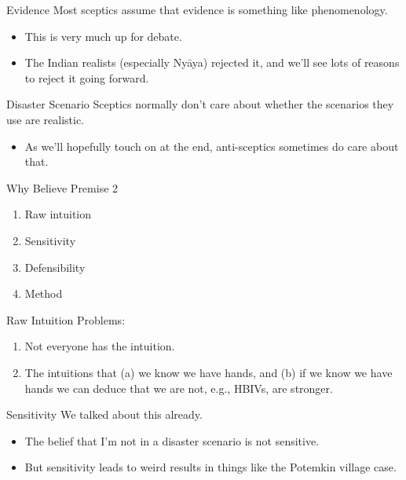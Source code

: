 \documentclass[
  17pt,
  letterpaper,
  ignorenonframetext,
  aspectratio=169,
  handout]{beamer}
\providecommand{\tightlist}{%
  \setlength{\itemsep}{0pt}\setlength{\parskip}{0pt}}\usepackage{longtable,booktabs,array}
\begin{document}
\begin{frame}{Evidence}
\protect\hypertarget{evidence}{}
Most sceptics assume that evidence is something like phenomenology.

\begin{itemize}[<+->]
\tightlist
\item
  This is very much up for debate.
\item
  The Indian realists (especially Nyāya) rejected it, and we'll see lots
  of reasons to reject it going forward.
\end{itemize}
\end{frame}

\begin{frame}{Disaster Scenario}
\protect\hypertarget{disaster-scenario}{}
Sceptics normally don't care about whether the scenarios they use are
realistic.

\begin{itemize}[<+->]
\tightlist
\item
  As we'll hopefully touch on at the end, anti-sceptics sometimes do
  care about that.
\end{itemize}
\end{frame}

\begin{frame}{Why Believe Premise 2}
\protect\hypertarget{why-believe-premise-2}{}
\begin{enumerate}[<+->]
\tightlist
\item
  Raw intuition
\item
  Sensitivity
\item
  Defensibility
\item
  Method
\end{enumerate}
\end{frame}

\begin{frame}{Raw Intuition}
\protect\hypertarget{raw-intuition}{}
Problems:

\begin{enumerate}[<+->]
\tightlist
\item
  Not everyone has the intuition.
\item
  The intuitions that (a) we know we have hands, and (b) if we know we
  have hands we can deduce that we are not, e.g., HBIVs, are stronger.
\end{enumerate}
\end{frame}

\begin{frame}{Sensitivity}
\protect\hypertarget{sensitivity}{}
We talked about this already.

\begin{itemize}[<+->]
\tightlist
\item
  The belief that I'm not in a disaster scenario is not sensitive.
\item
  But sensitivity leads to weird results in things like the Potemkin
  village case.
\end{itemize}
\end{frame}
\end{document}
